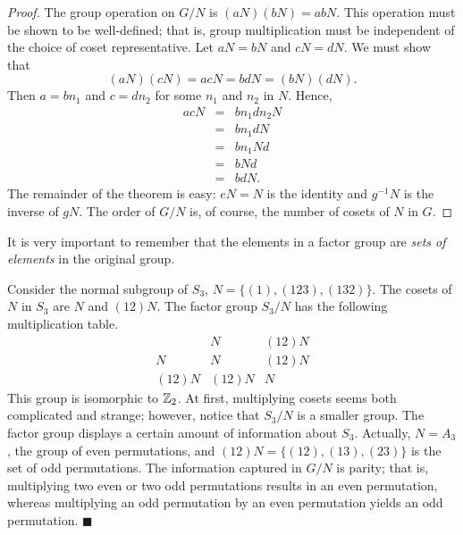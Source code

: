  
\begin{proof}
The group operation on $G/N$ is $(a N ) (b N)= a b N$.  This operation
must be shown to be well-defined; that is, group multiplication must
be independent of the choice of  coset representative. Let $aN = bN$
and $cN = dN$. We must show that
$$
(aN) (cN) = acN = bd N = (b N)(d N).
$$
Then $a = b n_1$ and $c = d n_2$ for some $n_1$ and $n_2$ in
$N$. Hence, 
\begin{eqnarray*}
acN & = & b n_1 d n_2 N \\
& = & b n_1 d N \\
& = & b n_1 N d \\
& = & b N d \\
& = & b d N.
\end{eqnarray*}
The remainder of the theorem is easy: $eN = N$ is the identity and
$g^{-1} N$ is the inverse of $gN$. The order of $G/N$ is, of course,
the number of cosets of $N$ in $G$. 
\end{proof}
 
 
\medskip
 
 
It is very important to remember that the elements in a factor group are
{\em sets of elements\/} in the original group. 
 
 
\medskip
 
 
Consider the normal subgroup of $S_3$, $N = \{ (1), (123), (132)  \}$.
The cosets of $N$ in $S_3$ are $N$ and $(12) N$. The factor group $S_3
/ N$ has the following multiplication table.
$$
\begin{array}{c|cc}
       & N      & (12) N \\
\hline
N      & N      & (12) N \\
(12) N & (12) N & N
\end{array}
$$
This group is isomorphic to ${\Bbb Z}_2$. At first, multiplying cosets
seems both complicated and strange; however, notice that  $S_3 / N$ is
a smaller group. The factor group displays a certain amount of
information about $S_3$.  Actually, $N = A_3$, the group of even
permutations, and $(12) N = \{ (12), (13), (23) \}$ is the set of odd
permutations. The information captured in $G/N$ is parity; that is,
multiplying two even or two odd permutations results in an even
permutation, whereas multiplying an odd permutation by an even
permutation yields an odd permutation.
\hspace{\fill} $\blacksquare$
 
 
\medskip
 

